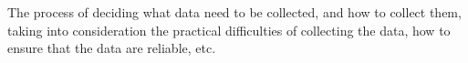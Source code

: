 The process of deciding what data need to be collected, and how to collect them,
taking into consideration the practical difficulties of collecting the data,
how to ensure that the data are reliable, etc.